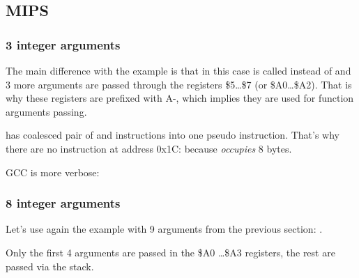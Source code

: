 \subsection{MIPS}

\subsubsection{3 integer arguments}


The main difference with the \q{\HelloWorldSectionName} example is that in this case \printf is called
instead of \puts and 3 more arguments are passed through the registers \$5\dots \$7 (or \$A0\dots \$A2).
That is why these registers are prefixed with A-, which implies they are used for function arguments passing.





\IDA has coalesced pair of  and  instructions into one  pseudo instruction.
That's why there are no instruction at address 0x1C: because  \emph{occupies} 8 bytes.


\NonOptimizing GCC is more verbose:





\subsubsection{8 integer arguments}

Let's use again the example with 9 arguments from the previous section: .




Only the first 4 arguments are passed in the \$A0 \dots \$A3 registers, the rest are passed via the stack.

